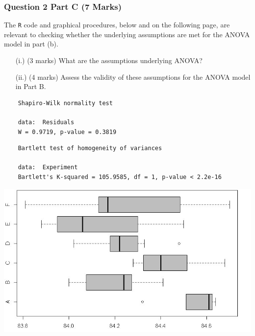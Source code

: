 \documentclass[a4paper,12pt]{article}
\begin{document}
\subsubsection*{Question 2 Part C (7 Marks)}
The \texttt{R} code and graphical procedures, below and on the following page, are relevant to checking whether the underlying assumptions are met for the ANOVA model in part (b).
\begin{itemize}
	\item[(i.)] (3 marks) What are the assumptions underlying ANOVA?
	\item[(ii.)] (4 marks)  Assess the validity of these assumptions for the ANOVA model in Part B.
	
\end{itemize}
\begin{framed}
	\begin{verbatim}
	Shapiro-Wilk normality test
	
	data:  Residuals
	W = 0.9719, p-value = 0.3819
	\end{verbatim}
\end{framed}
\begin{framed}
	\begin{verbatim}
	Bartlett test of homogeneity of variances
	
	data:  Experiment
	Bartlett's K-squared = 105.9585, df = 1, p-value < 2.2e-16
	\end{verbatim}
\end{framed}
\begin{center}
	\includegraphics[scale=0.59]{images/ExamQ5boxplot}
\end{center}
\newpage
\end{document}
